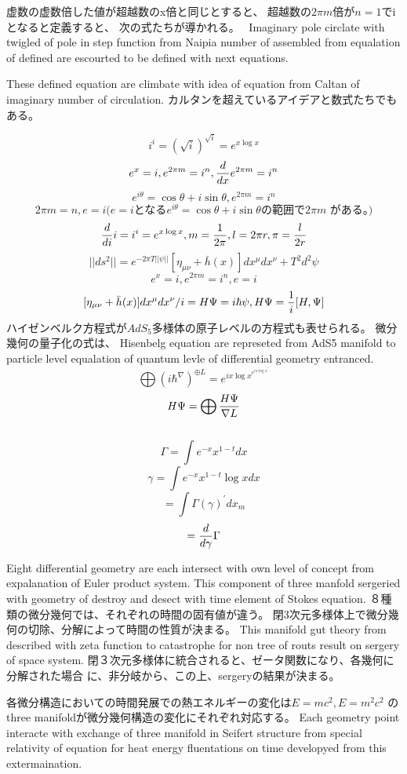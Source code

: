 \documentclass{jsarticle}
\begin{document}
   虚数の虚数倍した値が超越数のx倍と同じとすると、
   超越数の$2 \pi m$倍が$n=1$でiとなると定義すると、
   次の式たちが導かれる。　
   Imaginary pole circlate with twigled of pole in step function
   from Naipia number of assembled from equalation of defined are
   escourted to be defined with next equations.


   These defined equation are climbate with idea of equation from
   Caltan of imaginary number of circulation.
   カルタンを超えているアイデアと数式たちでもある。

   $$ i^i = (\sqrt{i})^{\sqrt{i}} = e^{x \log x} $$
   $$ e^x = i, e^{2\pi m} = i^n, {d \over d x}e^{2\pi m} = i^n $$
   $$ e^{i \theta} = \cos \theta + i \sin \theta, e^{2 \pi m} = i^n $$
   $$ 2 \pi m = n, e = i \text{($e=i$となる$e^{i \theta} = \cos \theta 
   + i \sin \theta $
   の範囲で$2\pi m$ がある。)}$$
   $$ {d \over d i}i = i^i = e^{x \log x}, m={1 \over 2 \pi},l=2\pi r, 
   \pi = {l \over 2r} $$
   $$ ||ds^2|| = e^{-2 \pi T||\psi||}[\eta_{\mu\nu} + \bar{h}(x)]
   dx^{\mu}dx^{\nu} + T^2 d^2 \psi $$
   $$ e^x = i, e^{2\pi m} = i^n, e = i $$
   $$ {{[\eta_{\mu\nu} + \bar{h}(x)]dx^{\mu}dx^{\nu}}/i} = H \Psi
   = i \hbar \psi, H \Psi = {1 \over i}[H, \Psi] $$
   ハイゼンベルク方程式が$ AdS_5 $多様体の原子レベルの方程式も表せられる。 
   微分幾何の量子化の式は、
   Hisenbelg equation are represeted from AdS5 manifold to particle level
   equalation of quantum levle of differential geometry entranced.
   $$ \bigoplus {({i \hbar} ^{\nabla})}^{\oplus L} = e^{{i x \log x}^{
	   {e^{i x \log x}}^{'}}} $$
   $$ H\Psi = \bigoplus {H \Psi \over \nabla L} $$
  　
 $$ \Gamma = \int e^{-x}x^{1 - t}dx $$
   $$ \gamma = \int e^{-x}x^{1 - t}\log x dx $$
   $$ = \int \Gamma(\gamma)^{'} dx_m$$
   $$ = {d \over d \gamma}\Gamma $$

   Eight differential geometry are each intersect with own level of
   concept from expalanation of Euler product system.
   This component of three manfold sergeried with geometry of destroy and
   desect with time element of Stokes equation.
   ８種類の微分幾何では、それぞれの時間の固有値が違う。
   閉3次元多様体上で微分幾何の切除、分解によって時間の性質が決まる。
   This manifold gut theory from described with zeta function to
   catastrophe for non tree of routs result on sergery of space system.
   閉３次元多様体に統合されると、ゼータ関数になり、各幾何に分解された場合
   に、非分岐から、この上、sergeryの結果が決まる。

   各微分構造においての時間発展での熱エネルギーの変化は$E=mc^2, E=m^2 c^2 $
   のthree manifoldが微分幾何構造の変化にそれぞれ対応する。
   Each geometry point interacte with exchange of three manifold in
   Seifert structure from special relativity of equation for
   heat energy fluentations on time developyed from this extermaination.
\end{document}
